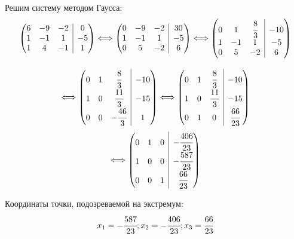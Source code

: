 {\textnormal{Решим систему методом Гаусса:}
\[%
\begin{pmatrix}
 6 & -9 & -2  & \multicolumn{5}{|c}{0}\\
 1 & -1 &  1  &\multicolumn{5}{|c}{-5}\\
 1 & 4 & -1   & \multicolumn{5}{|c}{1}\\
\end{pmatrix}
\Longleftrightarrow
\begin{pmatrix}
 0 & -9 & -2  &\multicolumn{5}{|c}{30}\\
 1 & -1 &  1  &\multicolumn{5}{|c}{-5}\\
 0 & 5 & -2  &\multicolumn{5}{|c}{6}\\
\end{pmatrix}
\Longleftrightarrow
\begin{pmatrix}
 0 & 1& \cfrac {8}{3}  &\multicolumn{5}{|c}{-10}\\
 1 & -1 &  1  &\multicolumn{5}{|c}{-5}\\
 0 & 5 & -2   &\multicolumn{5}{|c}{6}\\
\end{pmatrix}
\]
$$$$$$$$
\[
\Longleftrightarrow
\begin{pmatrix}
 0 & 1 & \cfrac {8}{3}  & \multicolumn{5}{|c}{-10}\\
 1 & 0 &  \cfrac {11}{3}  &\multicolumn{5}{|c}{-15}\\
 0 & 0 & -\cfrac {46}{3}  & \multicolumn{5}{|c}{1}\\
\end{pmatrix}
\Longleftrightarrow
\begin{pmatrix}
 0 & 1 & \cfrac {8}{3}  &\multicolumn{5}{|c}{-10}\\
 1 & 0 &  \cfrac {11}{3}  &\multicolumn{5}{|c}{-15}\\
 0 & 1 & 0  &\multicolumn{5}{|c}{ \cfrac {66}{23}}\\
\end{pmatrix}
\]
\[
\Longleftrightarrow
\begin{pmatrix}
 0 & 1 &  0  &\multicolumn{5}{|c}{-\cfrac {406}{23}}\\
 1 & 0 &  0  &\multicolumn{5}{|c}{-\cfrac {587}{23}}\\
 0 & 0 &  1   &\multicolumn{5}{|c}{ \cfrac {66}{23}}\\
\end{pmatrix}
\]%

\textnormal{Координаты точки, подозреваемой на экстремум:}
$$x_1 = -\cfrac {587}{23}; x_2 = -\cfrac {406}{23} ; x_3 = \cfrac {66}{23}$$
}
